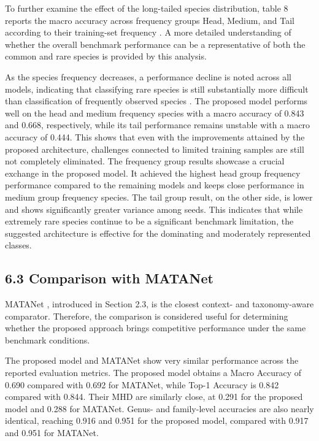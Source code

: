 \documentclass[preprint,12pt]{elsarticle}
\begin{document}
To further examine the effect of the long-tailed species distribution,
table 8 reports the macro accuracy across frequency groups Head, Medium,
and Tail according to their training-set frequency
\cite{ref16}. A more detailed understanding of
whether the overall benchmark performance can be a representative of
both the common and rare species is provided by this analysis.

As the species frequency decreases, a performance decline is noted
across all models, indicating that classifying rare species is still
substantially more difficult than classification of frequently observed
species \cite{ref10}
\cite{ref15}. The proposed model performs well
on the head and medium frequency species with a macro accuracy of 0.843
and 0.668, respectively, while its tail performance remains unstable
with a macro accuracy of 0.444. This shows that even with the
improvements attained by the proposed architecture, challenges connected
to limited training samples are still not completely eliminated. The
frequency group results showcase a crucial exchange in the proposed
model. It achieved the highest head group frequency performance compared
to the remaining models and keeps close performance in medium group
frequency species. The tail group result, on the other side, is lower
and shows significantly greater variance among seeds. This indicates
that while extremely rare species continue to be a significant benchmark
limitation, the suggested architecture is effective for the dominating
and moderately represented classes.

\subsection*{6.3 Comparison with MATANet}\label{comparison-with-matanet}

MATANet \cite{ref26}, introduced in Section 2.3,
is the closest context- and taxonomy-aware comparator. Therefore, the
comparison is considered useful for determining whether the proposed
approach brings competitive performance under the same benchmark
conditions.

The proposed model and MATANet show very similar performance across the
reported evaluation metrics. The proposed model obtains a Macro Accuracy
of 0.690 compared with 0.692 for MATANet, while Top-1 Accuracy is 0.842
compared with 0.844. Their MHD are similarly close, at 0.291 for the
proposed model and 0.288 for MATANet. Genus- and family-level accuracies
are also nearly identical, reaching 0.916 and 0.951 for the proposed
model, compared with 0.917 and 0.951 for MATANet.
\end{document}
